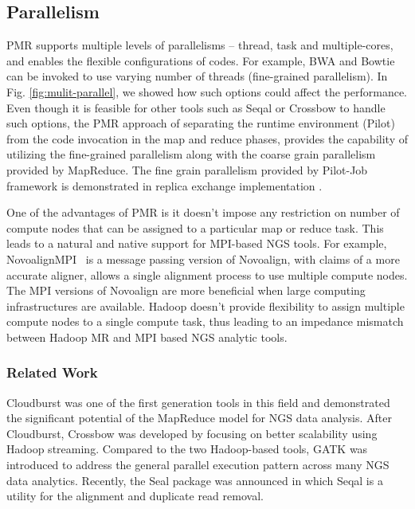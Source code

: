 \documentclass{acm_proc_article-sp}
\begin{document}
\subsection{Parallelism} 
PMR supports multiple levels of parallelisms -- thread, task and
multiple-cores, and enables the flexible configurations of codes. For
example, BWA and Bowtie can be invoked to use varying number of
threads (fine-grained parallelism).  In Fig. \ref{fig:mulit-parallel},
we showed how such options could affect the performance.  Even
though it is feasible for other tools such as Seqal or Crossbow to
handle such options, the PMR approach of separating the runtime
environment (Pilot) from the code invocation in the map and reduce
phases, provides the capability of utilizing the fine-grained
parallelism along with the coarse grain parallelism provided by
MapReduce. The fine grain parallelism provided by Pilot-Job framework is demonstrated in replica exchange implementation \cite{repex_ptrsa}.

One of the advantages of PMR is it doesn't impose any restriction on
number of compute nodes that can be assigned to a particular map or
reduce task. This leads to a natural and native support for MPI-based
NGS tools. For example,  NovoalignMPI~\cite{novo-align} is a message
passing version of Novoalign, with claims of a more accurate aligner,
allows a single alignment process to use multiple compute nodes. The
MPI versions of Novoalign are more beneficial when large computing
infrastructures are available.  Hadoop doesn't provide flexibility to
assign multiple compute nodes to a single compute task, thus leading
to an impedance mismatch between Hadoop MR and MPI based NGS analytic
tools.


\subsubsection*{Related Work}

Cloudburst was one of the first generation tools in this field and
demonstrated the significant potential of the MapReduce model for NGS
data analysis.  After Cloudburst, Crossbow was developed by focusing
on better scalability using Hadoop streaming.  Compared to the two
Hadoop-based tools, GATK was introduced to address the general
parallel execution pattern across many NGS data analytics.  Recently,
the Seal package was announced in which Seqal is a utility for the
alignment and duplicate read removal.
\end{document}
